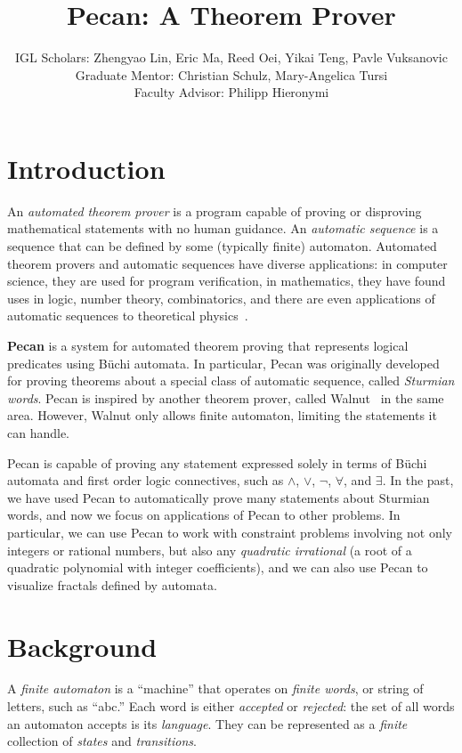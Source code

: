 \documentclass[10pt,usenames,dvipsnames]{article}
\title{Pecan: A Theorem Prover}
\author{%
IGL Scholars: Zhengyao Lin, Eric Ma, Reed Oei, Yikai Teng, Pavle Vuksanovic \\
Graduate Mentor: Christian Schulz, Mary-Angelica Tursi \\
Faculty Advisor: Philipp Hieronymi%
}
\begin{document}
\maketitle

\section{Introduction}

An \emph{automated theorem prover} is a program capable of proving or disproving mathematical statements with no human guidance. 
An \emph{automatic sequence} is a sequence that can be defined by some (typically finite) automaton.
Automated theorem provers and automatic sequences have diverse applications: in computer science, they are used for program verification, in mathematics, they have found uses in logic, number theory, combinatorics, and there are even applications of automatic sequences to theoretical physics~\cite{auto_seq}.

\textbf{Pecan} is a system for automated theorem proving that represents logical predicates using B\"uchi automata.
In particular, Pecan was originally developed for proving theorems about a special class of automatic sequence, called \emph{Sturmian words}.
Pecan is inspired by another theorem prover, called Walnut~\cite{walnut} in the same area.
However, Walnut only allows finite automaton, limiting the statements it can handle.

Pecan is capable of proving any statement expressed solely in terms of B\"uchi automata and first order logic connectives, such as $\wedge$, $\vee$, $\neg$, $\forall$, and $\exists$.
In the past, we have used Pecan to automatically prove many statements about Sturmian words, and now we focus on applications of Pecan to other problems.
In particular, we can use Pecan to work with constraint problems involving not only integers or rational numbers, but also any \emph{quadratic irrational} (a root of a quadratic polynomial with integer coefficients), and we can also use Pecan to visualize fractals defined by automata.

\section{Background}

A \emph{finite automaton} is a ``machine'' that operates on \emph{finite words}, or string of letters, such as ``abc.''
Each word is either \emph{accepted} or \emph{rejected}: the set of all words an automaton accepts is its \emph{language}.
They can be represented as a \emph{finite} collection of \emph{states} and \emph{transitions}.
\end{document}
